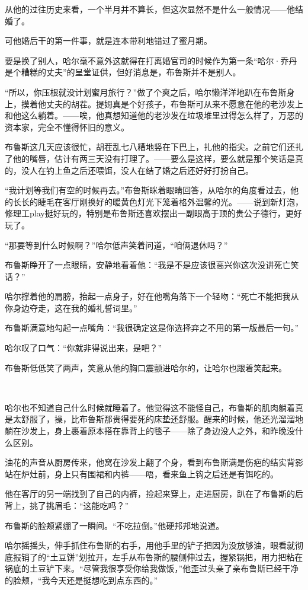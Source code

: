 \documentclass[../main]{subfiles}
\begin{document}
从他的过往历史来看，一个半月并不算长，但这次显然不是什么一般情况——他结婚了。

可他婚后干的第一件事，就是连本带利地错过了蜜月期。

要是换了别人，哈尔毫不意外这就得在打离婚官司的时候作为第一条“哈尔·乔丹是个糟糕的丈夫”的呈堂证供，但好消息是，布鲁斯并不是别人。

“所以，你压根就没计划蜜月旅行？”做了个爽之后，哈尔懒洋洋地趴在布鲁斯身上，摸着他丈夫的胡茬。提姆真是个好孩子，布鲁斯可从来不愿意在他的老沙发上和他这么躺着。——唉，他真想知道他的老沙发在垃圾堆里过得怎么样了，万恶的资本家，完全不懂得怀旧的意义。

布鲁斯这几天应该很忙，胡茬乱七八糟地竖在下巴上，扎他的指尖。之前它们还扎了他的嘴唇，估计有两三天没有打理了。——要么是这样，要么就是那个笑话是真的，没人在钓上鱼之后还喂饵，没人在结了婚之后还好好打扮自己。

“我计划等我们有空的时候再去。”布鲁斯眯着眼睛回答，从哈尔的角度看过去，他的长长的睫毛在客厅刚换好的暖黄色灯光下笼着格外温馨的光。——说到新灯泡，修理工play挺好玩的，特别是布鲁斯还喜欢摆出一副眼高于顶的贵公子德行，更好玩了。

“那要等到什么时候啊？”哈尔低声笑着问道，“咱俩退休吗？”

布鲁斯睁开了一点眼睛，安静地看着他：“我是不是应该很高兴你这次没讲死亡笑话？”

哈尔撑着他的肩膀，抬起一点身子，好在他嘴角落下一个轻吻：“死亡不能把我从你身边夺走，这在我的婚礼誓词里。”

布鲁斯满意地勾起一点嘴角：“我很确定这是你选择弃之不用的第一版最后一句。”

哈尔叹了口气：“你就非得说出来，是吧？”

布鲁斯低低笑了两声，笑意从他的胸口震颤进哈尔的，让哈尔也跟着笑起来。

~\

哈尔也不知道自己什么时候就睡着了。他觉得这不能怪自己，布鲁斯的肌肉躺着真是太舒服了，操，比布鲁斯那贵得要死的床垫还舒服。醒来的时候，他还光溜溜地躺在沙发上，身上裹着原本搭在靠背上的毯子——除了身边没人之外，和昨晚没什么区别。

油花的声音从厨房传来，他窝在沙发上翻了个身，看到布鲁斯满是伤疤的结实背影站在炉灶前，身上只有围裙和内裤——唔，看来鱼上钩之后还是有饵吃的。

他在客厅的另一端找到了自己的内裤，捡起来穿上，走进厨房，趴在了布鲁斯的后背上，挑了挑眉毛：“这能吃吗？”

布鲁斯的脸颊紧绷了一瞬间。“不吃拉倒。”他硬邦邦地说道。

哈尔摇摇头，伸手抓住布鲁斯的右手，用他手里的铲子把因为没放够油，眼看就彻底报销了的“土豆饼”划拉开，左手从布鲁斯的腰侧伸过去，握紧锅把，用力把粘在锅底的土豆铲下来。“尽管我很享受你给我做饭，”他歪过头亲了亲布鲁斯已经干净的脸颊，“我今天还是挺想吃到点东西的。”
\end{document}
